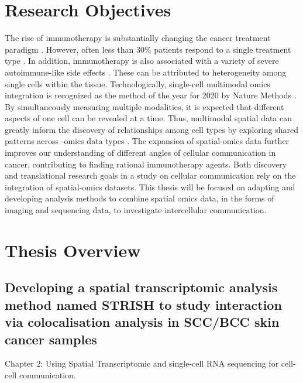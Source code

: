\section{Research Objectives}
The rise of immunotherapy is substantially changing the cancer treatment paradigm \cite{dobosz2019intriguing}. However, often less than $30\%$ patients respond to a single treatment type \cite{ott2017combination}. In addition, immunotherapy is also associated with a variety of severe autoimmune-like side effects \cite{naidoo2015toxicities,bertrand2015immune}. These can be attributed to heterogeneity among single cells within the tissue. Technologically, single-cell multimodal omics integration is recognized as the method of the year for 2020 by Nature Methods \cite{teichmann2020method}. By simultaneously measuring multiple modalities, it is expected that different aspects of one cell can be revealed at a time. Thus, multimodal spatial data can greatly inform the discovery of relationships among cell types by exploring shared patterns across -omics data types \cite{teichmann2020method}. The expansion of spatial-omics data further improves our understanding of different angles of cellular communication in cancer, contributing to finding rational immunotherapy agents. Both discovery and translational research goals in a study on cellular communication rely on the integration of spatial-omics datasets. This thesis will be focused on adapting and developing analysis methods to combine spatial omics data, in the forms of imaging and sequencing data, to investigate intercellular communication.   


\section{Thesis Overview}
\subsection{Developing a spatial transcriptomic analysis method named STRISH to study interaction via colocalisation analysis in SCC/BCC skin cancer samples}

Chapter 2: Using Spatial Transcriptomic and single-cell RNA sequencing for cell-cell communication. 

